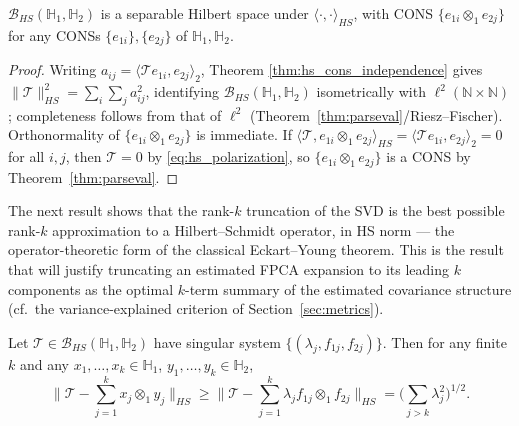 \begin{theorem}
\label{thm:hs_hilbert_space}
$\mathcal{B}_{HS}(\mathbb{H}_1,\mathbb{H}_2)$ is a separable Hilbert space
under $\langle\cdot,\cdot\rangle_{HS}$, with CONS $\{e_{1i}\otimes_1
e_{2j}\}$ for any CONSs $\{e_{1i}\},\{e_{2j}\}$ of $\mathbb{H}_1,
\mathbb{H}_2$.
\end{theorem}

\begin{proof}
Writing $a_{ij}=\langle\mathcal{T}e_{1i},e_{2j}\rangle_2$, Theorem
\ref{thm:hs_cons_independence} gives $\|\mathcal{T}\|_{HS}^2 = \sum_i\sum_j
a_{ij}^2$, identifying $\mathcal{B}_{HS}(\mathbb{H}_1,\mathbb{H}_2)$
isometrically with $\ell^2(\mathbb{N}\times\mathbb{N})$; completeness
follows from that of $\ell^2$ (Theorem~\ref{thm:parseval}/Riesz--Fischer).
Orthonormality of $\{e_{1i}\otimes_1e_{2j}\}$ is immediate. If
$\langle\mathcal{T},e_{1i}\otimes_1e_{2j}\rangle_{HS}=\langle\mathcal{T}
e_{1i},e_{2j}\rangle_2=0$ for all $i,j$, then $\mathcal{T}=0$ by
\eqref{eq:hs_polarization}, so $\{e_{1i}\otimes_1e_{2j}\}$ is a CONS by
Theorem~\ref{thm:parseval}.
\end{proof}

The next result shows that the rank-$k$ truncation of the SVD is the best
possible rank-$k$ approximation to a Hilbert--Schmidt operator, in HS norm
--- the operator-theoretic form of the classical Eckart--Young theorem.
This is the result that will justify truncating an estimated FPCA expansion
to its leading $k$ components as the optimal $k$-term summary of the
estimated covariance structure (cf.\ the variance-explained criterion of
Section~\ref{sec:metrics}).

\begin{theorem}
\label{thm:eckart_young}
Let $\mathcal{T}\in\mathcal{B}_{HS}(\mathbb{H}_1,\mathbb{H}_2)$ have
singular system $\{(\lambda_j,f_{1j},f_{2j})\}$. Then for any finite $k$
and any $x_1,\dots,x_k\in\mathbb{H}_1$, $y_1,\dots,y_k\in\mathbb{H}_2$,
\begin{equation}
\Big\|\mathcal{T}-\sum_{j=1}^kx_j\otimes_1y_j\Big\|_{HS} \geq
\Big\|\mathcal{T}-\sum_{j=1}^k\lambda_jf_{1j}\otimes_1f_{2j}\Big\|_{HS} =
\Big(\sum_{j>k}\lambda_j^2\Big)^{1/2}.
\label{eq:eckart_young}
\end{equation}
\end{theorem}

